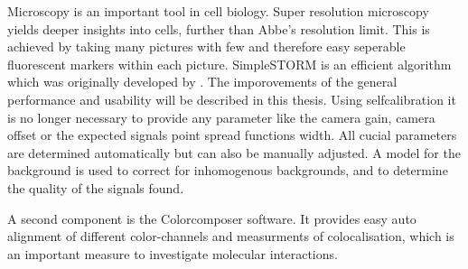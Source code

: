 Microscopy is an important tool in cell biology. Super resolution microscopy yields deeper insights into cells, further than Abbe's resolution limit. This is achieved by taking many pictures with few and therefore easy seperable fluorescent markers within each picture.\newline
SimpleSTORM is an efficient algorithm which was originally developed by \cite{MAJoachim}. The imporovements of the general performance and usability will be described in this thesis.\newline
Using selfcalibration it is no longer necessary to provide any parameter like the camera gain, camera offset or the expected signals point spread functions width. All cucial parameters are determined automatically but can also be manually adjusted. 
A model for the background is used to correct for inhomogenous backgrounds, and to determine the quality of the signals found.\newline

A second component is the Colorcomposer software. It provides easy auto alignment of different color-channels and measurments of colocalisation, which is an important measure to investigate molecular interactions.

